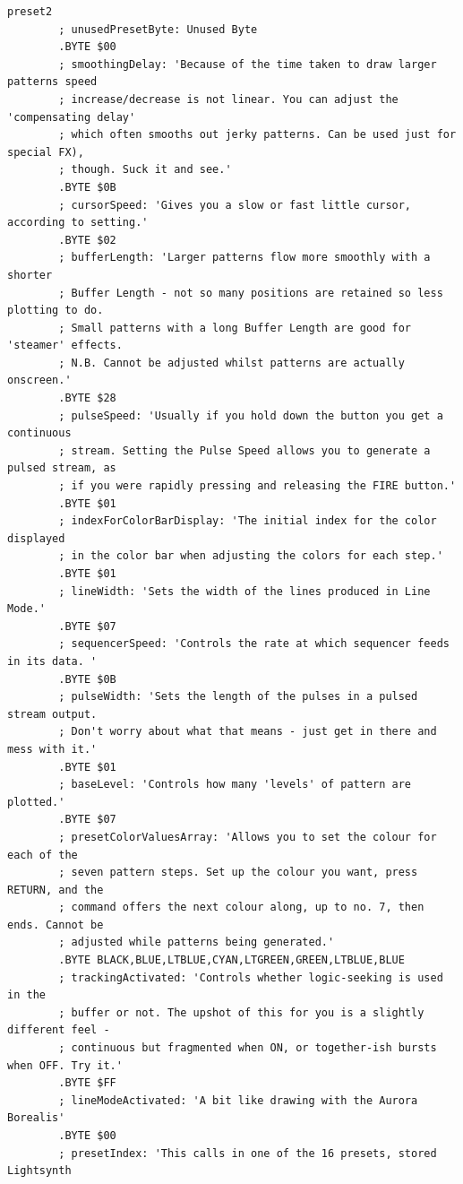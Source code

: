 \begin{lstlisting}[basicstyle=\tiny,caption=Source code for Preset 2.]
preset2
        ; unusedPresetByte: Unused Byte
        .BYTE $00
        ; smoothingDelay: 'Because of the time taken to draw larger patterns speed
        ; increase/decrease is not linear. You can adjust the 'compensating delay'
        ; which often smooths out jerky patterns. Can be used just for special FX),
        ; though. Suck it and see.'
        .BYTE $0B
        ; cursorSpeed: 'Gives you a slow or fast little cursor, according to setting.'
        .BYTE $02
        ; bufferLength: 'Larger patterns flow more smoothly with a shorter
        ; Buffer Length - not so many positions are retained so less plotting to do.
        ; Small patterns with a long Buffer Length are good for 'steamer' effects.
        ; N.B. Cannot be adjusted whilst patterns are actually onscreen.'
        .BYTE $28
        ; pulseSpeed: 'Usually if you hold down the button you get a continuous
        ; stream. Setting the Pulse Speed allows you to generate a pulsed stream, as
        ; if you were rapidly pressing and releasing the FIRE button.'
        .BYTE $01
        ; indexForColorBarDisplay: 'The initial index for the color displayed
        ; in the color bar when adjusting the colors for each step.'
        .BYTE $01
        ; lineWidth: 'Sets the width of the lines produced in Line Mode.'
        .BYTE $07
        ; sequencerSpeed: 'Controls the rate at which sequencer feeds in its data. '
        .BYTE $0B
        ; pulseWidth: 'Sets the length of the pulses in a pulsed stream output.
        ; Don't worry about what that means - just get in there and mess with it.'
        .BYTE $01
        ; baseLevel: 'Controls how many 'levels' of pattern are plotted.'
        .BYTE $07
        ; presetColorValuesArray: 'Allows you to set the colour for each of the
        ; seven pattern steps. Set up the colour you want, press RETURN, and the
        ; command offers the next colour along, up to no. 7, then ends. Cannot be
        ; adjusted while patterns being generated.'
        .BYTE BLACK,BLUE,LTBLUE,CYAN,LTGREEN,GREEN,LTBLUE,BLUE
        ; trackingActivated: 'Controls whether logic-seeking is used in the
        ; buffer or not. The upshot of this for you is a slightly different feel -
        ; continuous but fragmented when ON, or together-ish bursts when OFF. Try it.'
        .BYTE $FF
        ; lineModeActivated: 'A bit like drawing with the Aurora Borealis'
        .BYTE $00
        ; presetIndex: 'This calls in one of the 16 presets, stored Lightsynth

\end{lstlisting}
